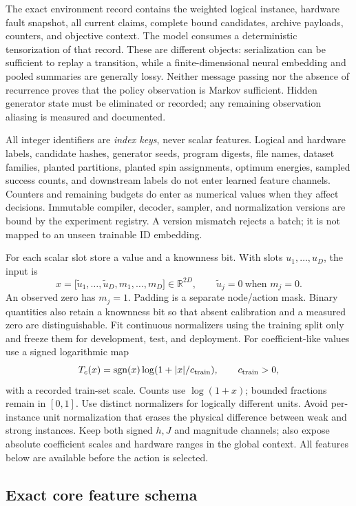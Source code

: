 \documentclass[11pt,a4paper]{article}
\theoremstyle{definition}\newtheorem{definition}[proposition]{Definition}
\begin{document}
The exact environment record contains the weighted logical instance, hardware fault snapshot, all current claims, complete bound candidates, archive payloads, counters, and objective context. The model consumes a deterministic tensorization of that record. These are different objects: serialization can be sufficient to replay a transition, while a finite-dimensional neural embedding and pooled summaries are generally lossy. Neither message passing nor the absence of recurrence proves that the policy observation is Markov sufficient. Hidden generator state must be eliminated or recorded; any remaining observation aliasing is measured and documented.

All integer identifiers are \emph{index keys}, never scalar features. Logical and hardware labels, candidate hashes, generator seeds, program digests, file names, dataset families, planted partitions, planted spin assignments, optimum energies, sampled success counts, and downstream labels do not enter learned feature channels. Counters and remaining budgets do enter as numerical values when they affect decisions. Immutable compiler, decoder, sampler, and normalization versions are bound by the experiment registry. A version mismatch rejects a batch; it is not mapped to an unseen trainable ID embedding.

For each scalar slot store a value and a knownness bit. With slots \(u_1,\ldots,u_D\), the input is
\[
 x=\bigl[\widetilde u_1,\ldots,\widetilde u_D,
         m_1,\ldots,m_D\bigr]\in\mathbb R^{2D},
 \qquad \widetilde u_j=0\ \text{when }m_j=0.
\]
An observed zero has \(m_j=1\). Padding is a separate node/action mask. Binary quantities also retain a knownness bit so that absent calibration and a measured zero are distinguishable. Fit continuous normalizers using the training split only and freeze them for development, test, and deployment. For coefficient-like values use a signed logarithmic map
\[
 T_c(x)=\operatorname{sgn}(x)\log(1+|x|/c_{\rm train}),
 \qquad c_{\rm train}>0,
\]
with a recorded train-set scale. Counts use \(\log(1+x)\); bounded fractions remain in \([0,1]\). Use distinct normalizers for logically different units. Avoid per-instance unit normalization that erases the physical difference between weak and strong instances. Keep both signed \(h,J\) and magnitude channels; also expose absolute coefficient scales and hardware ranges in the global context. All features below are available before the action is selected.

\subsection{Exact core feature schema}
\end{document}
